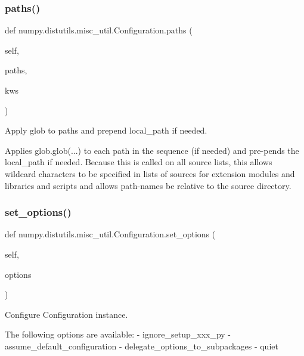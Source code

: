 \subsubsection{\texorpdfstring{paths()}{paths()}}
{\footnotesize\ttfamily def numpy.\+distutils.\+misc\+\_\+util.\+Configuration.\+paths (\begin{DoxyParamCaption}\item[{}]{self,  }\item[{}]{paths,  }\item[{}]{kws }\end{DoxyParamCaption})}

\begin{DoxyVerb}Apply glob to paths and prepend local_path if needed.

Applies glob.glob(...) to each path in the sequence (if needed) and
pre-pends the local_path if needed. Because this is called on all
source lists, this allows wildcard characters to be specified in lists
of sources for extension modules and libraries and scripts and allows
path-names be relative to the source directory.\end{DoxyVerb}
 \mbox{\label{classnumpy_1_1distutils_1_1misc__util_1_1Configuration_a6e2522277c649460194c04311856ab37}} 
\subsubsection{\texorpdfstring{set\+\_\+options()}{set\_options()}}
{\footnotesize\ttfamily def numpy.\+distutils.\+misc\+\_\+util.\+Configuration.\+set\+\_\+options (\begin{DoxyParamCaption}\item[{}]{self,  }\item[{}]{options }\end{DoxyParamCaption})}

\begin{DoxyVerb}Configure Configuration instance.

The following options are available:
 - ignore_setup_xxx_py
 - assume_default_configuration
 - delegate_options_to_subpackages
 - quiet\end{DoxyVerb}
 \mbox{\label{classnumpy_1_1distutils_1_1misc__util_1_1Configuration_ad4d28fab398852bb9be35fdea8d28435}} 
